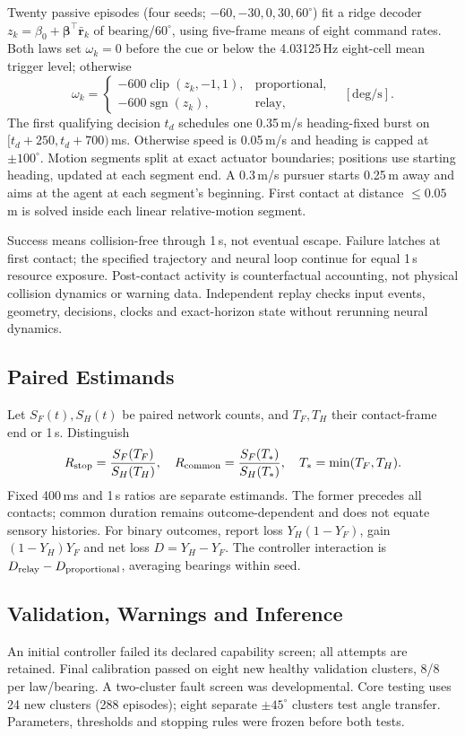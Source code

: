 Twenty passive episodes (four seeds; $-60,-30,0,30,60^\circ$) fit a ridge decoder $z_k=\beta_0+\boldsymbol\beta^\top\bar{\mathbf r}_k$ of bearing/$60^\circ$, using five-frame means of eight command rates. Both laws set $\omega_k=0$ before the cue or below the 4.03125\,Hz eight-cell mean trigger level; otherwise
\begin{equation}
\omega_k=\begin{cases}
-600\operatorname{clip}(z_k,-1,1),&\text{proportional},\\
-600\operatorname{sgn}(z_k),&\text{relay},
\end{cases}\quad[\mathrm{deg/s}].
\end{equation}
The first qualifying decision $t_d$ schedules one 0.35\,m/s heading-fixed burst on $[t_d+250,t_d+700)$\,ms. Otherwise speed is 0.05\,m/s and heading is capped at $\pm100^\circ$. Motion segments split at exact actuator boundaries; positions use starting heading, updated at each segment end. A 0.3\,m/s pursuer starts 0.25\,m away and aims at the agent at each segment's beginning. First contact at distance $\leq0.05$\,m is solved inside each linear relative-motion segment.

Success means collision-free through 1\,s, not eventual escape. Failure latches at first contact; the specified trajectory and neural loop continue for equal 1\,s resource exposure. Post-contact activity is counterfactual accounting, not physical collision dynamics or warning data. Independent replay checks input events, geometry, decisions, clocks and exact-horizon state without rerunning neural dynamics.

\subsection{Paired Estimands}
Let $S_F(t),S_H(t)$ be paired network counts, and $T_F,T_H$ their contact-frame end or 1\,s. Distinguish
\begin{equation}
R_{\rm stop}=\frac{S_F(T_F)}{S_H(T_H)},\quad
R_{\rm common}=\frac{S_F(T_*)}{S_H(T_*)},\quad T_*=\min(T_F,T_H).
\end{equation}
Fixed 400\,ms and 1\,s ratios are separate estimands. The former precedes all contacts; common duration remains outcome-dependent and does not equate sensory histories. For binary outcomes, report loss $Y_H(1-Y_F)$, gain $(1-Y_H)Y_F$ and net loss $D=Y_H-Y_F$. The controller interaction is $D_{\rm relay}-D_{\rm proportional}$, averaging bearings within seed.

\subsection{Validation, Warnings and Inference}
An initial controller failed its declared capability screen; all attempts are retained. Final calibration passed on eight new healthy validation clusters, 8/8 per law/bearing. A two-cluster fault screen was developmental. Core testing uses 24 new clusters (288 episodes); eight separate $\pm45^\circ$ clusters test angle transfer. Parameters, thresholds and stopping rules were frozen before both tests.

